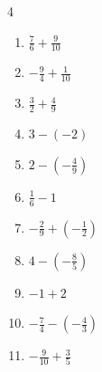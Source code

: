 \begin{multicols}{4}
\begin{enumerate}

  \item $\displaystyle \frac{7}{6} + \frac{9}{10}$


  \item $\displaystyle -\frac{9}{4} + \frac{1}{10}$


  \item $\displaystyle \frac{3}{2} + \frac{4}{9}$


  \item $\displaystyle 3 - \left(-2\right)$

        \phantom{$\displaystyle =5$}

  \item $\displaystyle 2 - \left(-\frac{4}{9}\right)$


  \item $\displaystyle \frac{1}{6} - 1$


  \item $\displaystyle -\frac{2}{9} + \left(-\frac{1}{2}\right)$


\columnbreak %

\resetques

  \item $\displaystyle 4 - \left(-\frac{8}{5}\right)$


  \item $\displaystyle -1 + 2$

        \phantom{$\displaystyle =1$}

  \item $\displaystyle -\frac{7}{4} - \left(-\frac{4}{3}\right)$


  \item $\displaystyle -\frac{9}{10} + \frac{3}{5}$



\end{enumerate}
\end{multicols}
